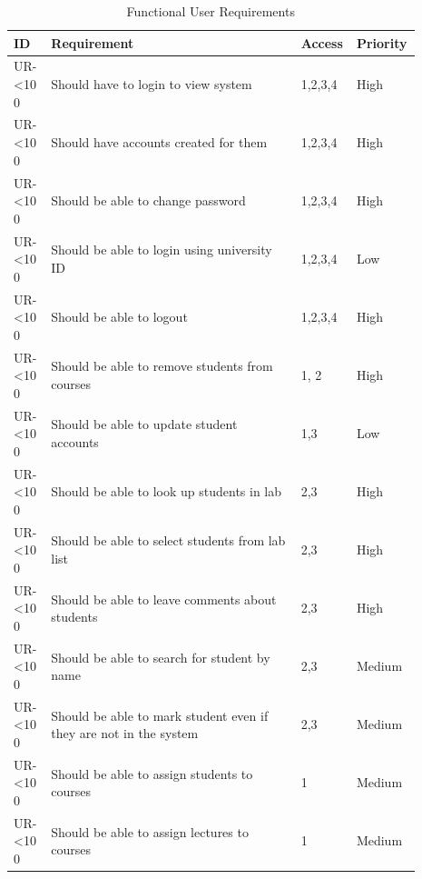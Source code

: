 \documentclass[12pt]{article}  %
\newcommand{\rid}[1]{\centering #1-\ifnum\value{requirement}<10 0\fi\arabic{requirement} \stepcounter{requirement}}
\begin{document}
\begin{spacing}{1.2}
\begin{longtable}{|p{0.09\linewidth}|p{0.6\linewidth}|p{0.1\linewidth}|
p{0.1\linewidth}|}
\caption{Functional User Requirements} \label{table:funct-user} \\
\hline


\textbf{ID} & \textbf{Requirement} & \textbf{Access} & \textbf{Priority}\\
\hline \hline


\rid{UR} & Should have to login to view system & 1,2,3,4 & High\\ \hline
\rid{UR} & Should have accounts created for them & 1,2,3,4 & High\\ \hline
\rid{UR} & Should be able to change password & 1,2,3,4 & High\\ \hline
\rid{UR} & Should be able to login using university ID & 1,2,3,4 & Low\\ \hline
\rid{UR} & Should be able to logout & 1,2,3,4 & High \\ \hline

\rid{UR} & Should be able to remove students from courses & 1, 2 & High\\ \hline
\rid{UR} & Should be able to update student accounts & 1,3 & Low \\ \hline

\rid{UR} & Should be able to look up students in lab & 2,3 & High\\ \hline
\rid{UR} & Should be able  to select students from lab list & 2,3 & High\\ \hline
\rid{UR} & Should be able to leave comments about students & 2,3 & High\\ \hline
\rid{UR} & Should be able to search for student by name & 2,3 & Medium\\ \hline
\rid{UR} & Should be able to mark student even if they are not in the system & 2,3 & Medium \\ \hline

\rid{UR} & Should be able to assign students to courses & 1 & Medium\\ \hline
\rid{UR} & Should be able to assign lectures to courses & 1 & Medium \\ \hline


\end{longtable}
\end{spacing}
\end{document}
